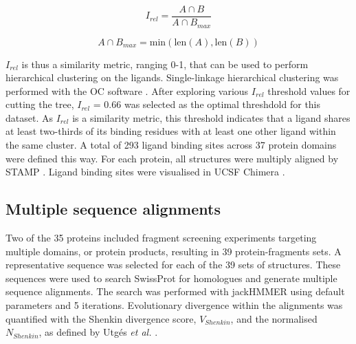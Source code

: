 \begin{equation}
    I_{rel} = \frac{A \cap B}{A \cap B_{max}}
\label{eq:relative_intersection} %
\end{equation}

\vspace{-35pt} %

\begin{equation}
    A \cap B_{max} = \text{min}(\text{len}(A), \text{len}(B))
\label{eq:max_intersection}
\end{equation}
\vspace{-21pt} %

$I_{rel}$ is thus a similarity metric, ranging 0-1, that can be used to perform hierarchical clustering on the ligands. Single-linkage hierarchical clustering was performed with the OC software \cite{BARTON_1993_OC}. After exploring various $I_{rel}$ threshold values for cutting the tree, $I_{rel}$ = 0.66 was selected as the optimal threshdold for this dataset. As $I_{rel}$ is a similarity metric, this threshold indicates that a ligand shares at least two-thirds of its binding residues with at least one other ligand within the same cluster. A total of 293 ligand binding sites across 37 protein domains were defined this way. For each protein, all structures were multiply aligned by STAMP \cite{RUSSELL_1992_STAMP}. Ligand binding sites were visualised in UCSF Chimera \cite{PETTERSEN_2004_CHIMERA}.

\subsection{Multiple sequence alignments}

Two of the 35 proteins included fragment screening experiments targeting multiple domains, or protein products, resulting in 39 protein-fragments sets. A representative sequence was selected for each of the 39 sets of structures. These sequences were used to search SwissProt \cite{BOUTET_2016_UNIPROT} for homologues and generate multiple sequence alignments. The search was performed with jackHMMER \cite{EDDY_1995_HMMER} using default parameters and 5 iterations. Evolutionary divergence within the alignments was quantified with the Shenkin divergence score, $V_{Shenkin}$, \cite{SHENKIN_1991_SCORE} and the normalised $N_{Shenkin}$, as defined by Utgés \textit{et al.} \cite{UTGES_2021_ANKS}.

